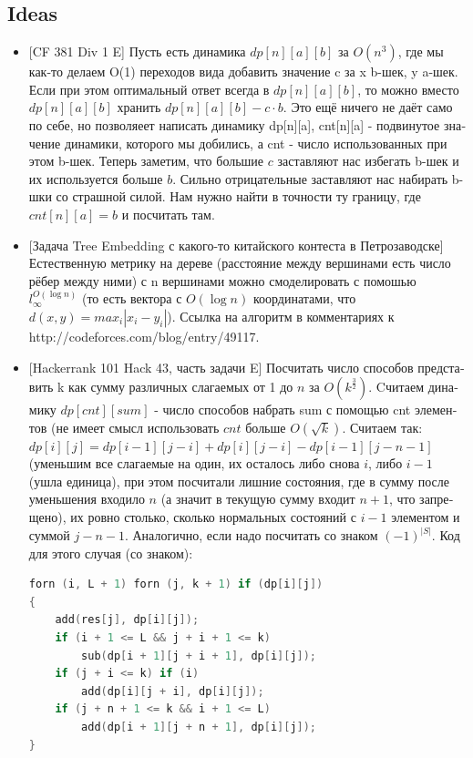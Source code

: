 \subsection{Ideas}
\begin{itemize}
    \item 
\foreignlanguage{russian}{[CF 381 Div 1 E] Пусть есть динамика $dp[n][a][b]$ за $O(n^3)$, где мы как-то делаем O(1)
переходов вида добавить значение c за x b-шек, y a-шек. Если при этом оптимальный ответ
всегда в $dp[n][a][b]$, то можно вместо $dp[n][a][b]$ хранить $dp[n][a][b] - c \cdot b$. Это ещё
ничего не даёт само по себе, но позволяеет написать динамику dp[n][a], cnt[n][a] -
подвинутое значение динамики, которого мы добились, а cnt - число использованных при
этом b-шек. Теперь заметим, что большие $c$ заставляют нас избегать b-шек и их используется
больше $b$. Сильно отрицательные заставляют нас набирать b-шки со страшной силой. Нам нужно
найти в точности ту границу, где $cnt[n][a] = b$ и посчитать там.}

\item
\foreignlanguage{russian}{[Задача Tree Embedding с какого-то китайского контеста в Петрозаводске] Естественную
метрику на дереве (расстояние между вершинами есть число рёбер между ними) с n вершинами
можно смоделировать с помошью $l_{\infty}^{O(\log{n})}$ (то есть вектора с $O(\log{n})$ координатами,
что $d(x, y) = max_i |x_i - y_i|$). Ссылка на алгоритм в комментариях
к} http://codeforces.com/blog/entry/49117.

\item
\foreignlanguage{russian}{
[Hackerrank 101 Hack 43, часть задачи E]
Посчитать число способов представить k как сумму различных слагаемых от 1 до $n$ за $O(k^{\frac{3}{2}})$.
Cчитаем динамику $dp[cnt][sum]$ - число способов набрать sum с помощью cnt элементов
(не имеет смысл использовать $cnt$ больше $O(\sqrt{k})$. Считаем так: $dp[i][j] =
dp[i - 1][j - i] + dp[i][j - i] - dp[i - 1][j - n - 1]$ (уменьшим все слагаемые на один, их
осталось либо снова $i$, либо $i - 1$ (ушла единица), при этом посчитали лишние состояния,
где в сумму после уменьшения входило $n$ (а значит в текущую сумму входит $n+1$, что запрещено),
их ровно столько, сколько нормальных состояний с $i - 1$ элементом и суммой $j - n - 1$.
Аналогично, если надо посчитать со знаком $(-1)^{|S|}$. Код для этого случая (со знаком):}
\begin{lstlisting}[language=c++]
forn (i, L + 1) forn (j, k + 1) if (dp[i][j])
{
	add(res[j], dp[i][j]);
	if (i + 1 <= L && j + i + 1 <= k)
		sub(dp[i + 1][j + i + 1], dp[i][j]);
	if (j + i <= k) if (i)
		add(dp[i][j + i], dp[i][j]);
	if (j + n + 1 <= k && i + 1 <= L)
		add(dp[i + 1][j + n + 1], dp[i][j]);
}
\end{lstlisting}


\end{itemize}
